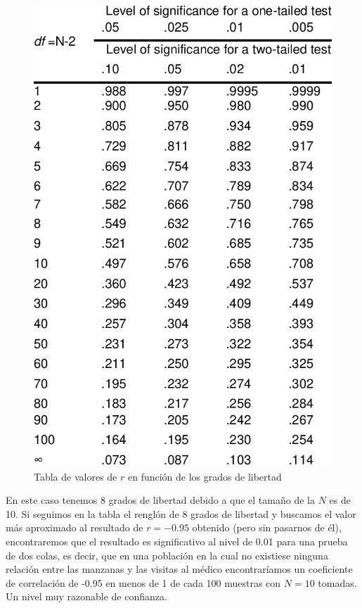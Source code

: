\documentclass[a4paper,12pt]{article}
\begin{document}
\begin{figure}[!ht]
  \begin{center}
    \includegraphics[scale=0.3]{rtable.png}
    \caption{Tabla de valores de $r$ en función de los grados de libertad}
  \end{center}
\end{figure}

En este caso tenemos 8 grados de libertad debido a que el tamaño de la  $N$ es de 10. Si seguimos en la tabla el renglón de 8 grados de libertad y buscamos el valor más aproximado al resultado de $r = -0.95$ obtenido (pero sin pasarnos de él), encontraremos que el resultado es significativo al nivel de 0.01 para una prueba de dos colas, es decir, que en una población en la cual no existiese ninguna relación entre las manzanas y las visitas al médico encontraríamos un coeficiente de correlación de -0.95 en menos de 1 de cada 100 muestras con $N = 10$ tomadas. Un nivel muy razonable de confianza.
\end{document}
